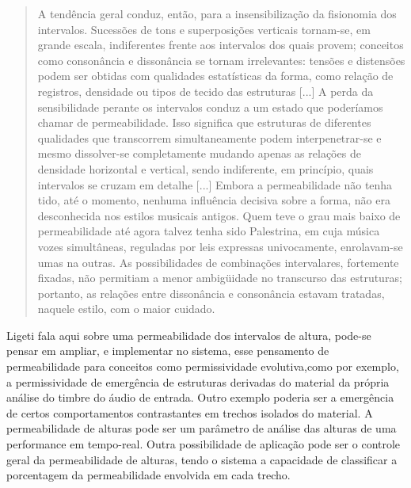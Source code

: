 \documentclass[draft]{ppgmus}
\begin{document}
\begin{quote}
  A tendência geral conduz, então, para a insensibilização da
  fisionomia dos intervalos. Sucessões de tons e superposições
  verticais tornam-se, em grande escala, indiferentes frente aos
  intervalos dos quais provem; conceitos como consonância e
  dissonância se tornam irrelevantes: tensões e distensões podem ser
  obtidas com qualidades estatísticas da forma, como relação de
  registros, densidade ou tipos de tecido das estruturas [...] A perda
  da sensibilidade perante os intervalos conduz a um estado que
  poderíamos chamar de permeabilidade. Isso significa que estruturas
  de diferentes qualidades que transcorrem simultaneamente podem
  interpenetrar-se e mesmo dissolver-se completamente mudando apenas
  as relações de densidade horizontal e vertical, sendo indiferente,
  em princípio, quais intervalos se cruzam em detalhe [...] Embora a
  permeabilidade não tenha tido, até o momento, nenhuma influência
  decisiva sobre a forma, não era desconhecida nos estilos musicais
  antigos. Quem teve o grau mais baixo de permeabilidade até agora
  talvez tenha sido Palestrina, em cuja música vozes simultâneas,
  reguladas por leis expressas univocamente, enrolavam-se umas na
  outras. As possibilidades de combinações intervalares, fortemente
  fixadas, não permitiam a menor ambigüidade no transcurso das
  estruturas; portanto, as relações entre dissonância e consonância
  estavam tratadas, naquele estilo, com o maior cuidado. \cite{ligeti58:transformacoes}
\end{quote}
 
Ligeti fala aqui sobre uma permeabilidade dos intervalos de altura,
pode-se pensar em ampliar, e implementar no sistema, esse pensamento
de permeabilidade para conceitos como permissividade evolutiva,como por
exemplo, a permissividade de emergência de estruturas derivadas do material 
da própria análise do timbre do áudio de entrada. Outro exemplo poderia ser a 
emergência de certos comportamentos contrastantes em trechos isolados do material.
A permeabilidade de alturas pode ser um parâmetro de análise das alturas 
de uma performance em tempo-real. Outra possibilidade de aplicação pode ser o
controle geral da permeabilidade de alturas, tendo o sistema a capacidade de
classificar a porcentagem da permeabilidade envolvida em cada trecho. 
\end{document}
